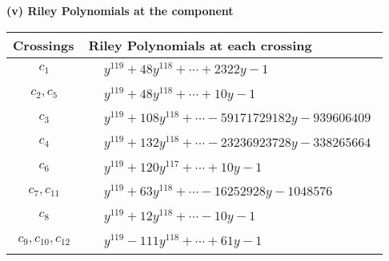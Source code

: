 \documentclass[1p]{elsarticle_modified}
\theoremstyle{definition}
\begin{document}
\newpage\renewcommand{\arraystretch}{1}
\flushleft \textbf{(v) Riley Polynomials at the component}\newline \\
\begin{tabular}{m{50pt}|m{274pt}}
Crossings & \hspace{64pt}Riley Polynomials at each crossing \\
\hline $$\begin{aligned}c_{1}\end{aligned}$$&$\begin{aligned}
&y^{119}+48 y^{118}+\cdots+2322 y-1
\end{aligned}$\\
\hline $$\begin{aligned}c_{2},c_{5}\end{aligned}$$&$\begin{aligned}
&y^{119}+48 y^{118}+\cdots+10 y-1
\end{aligned}$\\
\hline $$\begin{aligned}c_{3}\end{aligned}$$&$\begin{aligned}
&y^{119}+108 y^{118}+\cdots-59171729182 y-939606409
\end{aligned}$\\
\hline $$\begin{aligned}c_{4}\end{aligned}$$&$\begin{aligned}
&y^{119}+132 y^{118}+\cdots-23236923728 y-338265664
\end{aligned}$\\
\hline $$\begin{aligned}c_{6}\end{aligned}$$&$\begin{aligned}
&y^{119}+120 y^{117}+\cdots+10 y-1
\end{aligned}$\\
\hline $$\begin{aligned}c_{7},c_{11}\end{aligned}$$&$\begin{aligned}
&y^{119}+63 y^{118}+\cdots-16252928 y-1048576
\end{aligned}$\\
\hline $$\begin{aligned}c_{8}\end{aligned}$$&$\begin{aligned}
&y^{119}+12 y^{118}+\cdots-10 y-1
\end{aligned}$\\
\hline $$\begin{aligned}c_{9},c_{10},c_{12}\end{aligned}$$&$\begin{aligned}
&y^{119}-111 y^{118}+\cdots+61 y-1
\end{aligned}$\\
\hline
\end{tabular}\\~\\
\end{document}
